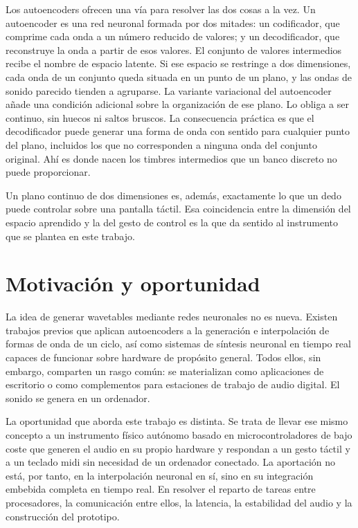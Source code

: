 Los autoencoders ofrecen una vía para resolver las dos cosas a la vez. Un
autoencoder es una red neuronal formada por dos mitades: un codificador, que
comprime cada onda a un número reducido de valores; y un decodificador, que
reconstruye la onda a partir de esos valores. El conjunto de valores intermedios
recibe el nombre de espacio latente. Si ese espacio se restringe a dos
dimensiones, cada onda de un conjunto queda situada en un punto de un plano, y las
ondas de sonido parecido tienden a agruparse. La variante variacional del
autoencoder añade una condición adicional sobre la organización de ese plano. Lo
obliga a ser continuo, sin huecos ni saltos bruscos. La consecuencia
práctica es que el decodificador puede generar una forma de onda con sentido para
cualquier punto del plano, incluidos los que no corresponden a ninguna onda del
conjunto original. Ahí es donde nacen los timbres intermedios que un banco
discreto no puede proporcionar.

Un plano continuo de dos dimensiones es, además, exactamente lo que un dedo
puede controlar sobre una pantalla táctil. Esa coincidencia entre la dimensión
del espacio aprendido y la del gesto de control es la que da sentido al
instrumento que se plantea en este trabajo.

\section{Motivación y oportunidad}
\hypertarget{RE1.1b}{}\label{RE1.1b}

La idea de generar wavetables mediante redes neuronales no es nueva. Existen
trabajos previos que aplican autoencoders a la generación e interpolación de
formas de onda de un ciclo, así como sistemas de síntesis neuronal en tiempo
real capaces de funcionar sobre hardware de propósito general. Todos ellos, sin
embargo, comparten un rasgo común: se materializan como aplicaciones de
escritorio o como complementos para estaciones de trabajo de audio digital. El
sonido se genera en un ordenador.

La oportunidad que aborda este trabajo es distinta. Se trata de llevar ese mismo
concepto a un instrumento físico autónomo basado en microcontroladores
de bajo coste que generen el audio en su propio hardware y respondan a un gesto
táctil y a un teclado \gls{midi} sin necesidad de un ordenador conectado. La
aportación no está, por tanto, en la interpolación neuronal en sí, sino en su
integración embebida completa en tiempo real. En resolver el reparto de tareas
entre procesadores, la comunicación entre ellos, la latencia, la estabilidad del
audio y la construcción del prototipo.


